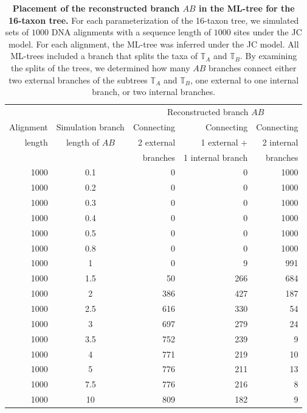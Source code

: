 \begin{appendices}
\begin{table}[hb]
    \centering
    \begin{tabular}{|r|c|r|r|r|}
\hline
 &  &\multicolumn{3}{c|}{Reconstructed branch $AB$}\\
Alignment &Simulation branch&   Connecting  & Connecting &  Connecting\\
length &length of $AB$ &     2 external & 1 external +  & 2 internal \\
&&     branches & 1 internal branch & branches\\
\hline
1000	&0.1	&  0	& 0  & 1000 \\
1000	&0.2	&  0	& 0  & 1000 \\
1000	&0.3	&  0	& 0  & 1000 \\
1000	&0.4	&  0	& 0  & 1000 \\
1000	&0.5	&  0	& 0  & 1000 \\
1000	&0.8	&  0   	& 0  & 1000 \\
1000	&1   	& 0	    & 9  & 991 \\
1000	&1.5	&50	    &266 & 684 \\
1000	&2  	&386	&427 &187 \\
1000	&2.5	&616	&330 &54 \\
1000	&3  	&697	&279 &24 \\
1000	&3.5	&752	&239 & 9 \\
1000	&4      &771	&219 &10\\
1000	&5  	&776	&211 &13 \\
1000	&7.5	&776	&216 &8 \\
1000	&10 	&809	&182 &9 \\
\hline
    \end{tabular}
    \vspace{0.25cm}
    \caption{
        \textbf{Placement of the reconstructed branch $AB$ in the ML-tree for the 16-taxon tree.}
        For each parameterization of the 16-taxon tree, we simulated sets of $1000$ DNA alignments with a sequence length of $1000$ sites under the JC model. For each alignment, the ML-tree was inferred under the JC model. All ML-trees included a branch that splits the taxa of $\mathbb{T}_A$ and $\mathbb{T}_B$. By examining the splits of the trees, we determined how many $AB$ branches connect either two external branches of the subtrees $\mathbb{T}_A$ and $\mathbb{T}_B$, one external to one internal branch, or two internal branches.
   }
    \label{supptab:bonferroni_correction_1000}
    \end{table}\hfill\\


\end{appendices}

